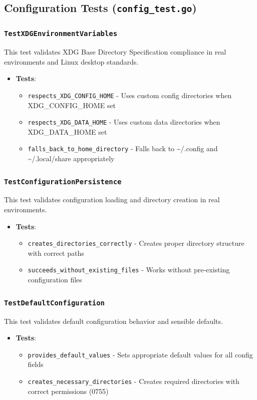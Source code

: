 \subsection{Configuration Tests (\texttt{config\_test.go})}

\subsubsection*{\texttt{TestXDGEnvironmentVariables}}
This test validates XDG Base Directory Specification compliance in real environments and Linux desktop standards.
\begin{itemize}
    \item \textbf{Tests}:
    \begin{itemize}
        \item \texttt{respects\_XDG\_CONFIG\_HOME} - Uses custom config directories when XDG\_CONFIG\_HOME set
        \item \texttt{respects\_XDG\_DATA\_HOME} - Uses custom data directories when XDG\_DATA\_HOME set
        \item \texttt{falls\_back\_to\_home\_directory} - Falls back to \textasciitilde/.config and \textasciitilde/.local/share appropriately
    \end{itemize}
\end{itemize}

\subsubsection*{\texttt{TestConfigurationPersistence}}
This test validates configuration loading and directory creation in real environments.
\begin{itemize}
    \item \textbf{Tests}:
    \begin{itemize}
        \item \texttt{creates\_directories\_correctly} - Creates proper directory structure with correct paths
        \item \texttt{succeeds\_without\_existing\_files} - Works without pre-existing configuration files
    \end{itemize}
\end{itemize}

\subsubsection*{\texttt{TestDefaultConfiguration}}
This test validates default configuration behavior and sensible defaults.
\begin{itemize}
    \item \textbf{Tests}:
    \begin{itemize}
        \item \texttt{provides\_default\_values} - Sets appropriate default values for all config fields
        \item \texttt{creates\_necessary\_directories} - Creates required directories with correct permissions (0755)
    \end{itemize}
\end{itemize}


